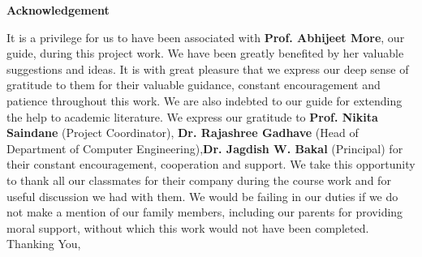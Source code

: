 \documentclass[12pt]{article}
\begin{document}
\justifying
\noindent
\begin{center}
{\Large \textbf{Acknowledgement}}\\[0.6cm]
\end{center}
\justifying

\noindent It is a privilege for us to have been associated with \textbf{Prof. Abhijeet More}, our guide, during
this project work. We have been greatly benefited by her valuable suggestions and ideas. It
is with great pleasure that we express our deep sense of gratitude to them for their valuable
guidance, constant encouragement and patience throughout this work. We are also indebted
to our guide for extending the help to academic literature. We express our gratitude to \textbf{Prof.
Nikita Saindane} (Project Coordinator), \textbf{Dr. Rajashree Gadhave} (Head of Department of
Computer Engineering),\textbf{Dr. Jagdish W. Bakal} (Principal) for their constant encouragement,
cooperation and support. We take this opportunity to thank all our classmates for their company
during the course work and for useful discussion we had with them. We would be failing in our
duties if we do not make a mention of our family members, including our parents for providing
moral support, without which this work would not have been completed.
Thanking You,
\vspace{1cm}

\begin{flushright}
  
     \\[0.3cm]
   
\end{flushright}
\end{document}
